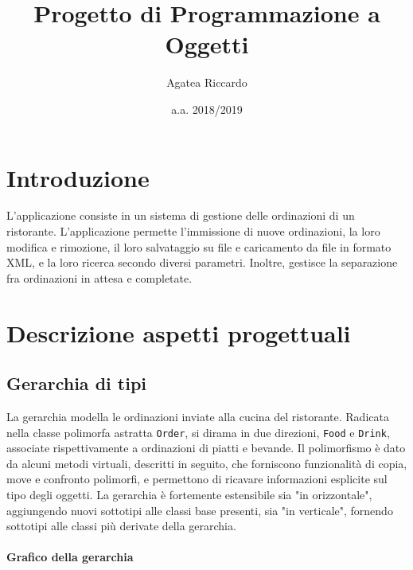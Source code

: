 \documentclass{article}
\title{Progetto di Programmazione a Oggetti}
\author{Agatea Riccardo}
\date{a.a. 2018/2019}
\newcommand{\code}[1]{\texttt{#1}}
\begin{document}
\maketitle
\newpage
{}
\section{Introduzione} %
\label{sec:introduzione}
L'applicazione consiste in un sistema di gestione delle ordinazioni di un ristorante. L'applicazione permette l'immissione di nuove ordinazioni, la loro modifica e rimozione, il loro salvataggio su file e caricamento da file in formato XML, e la loro ricerca secondo diversi parametri. Inoltre, gestisce la separazione fra ordinazioni in attesa e completate.
\section{Descrizione aspetti progettuali} %
\label{sec:descrizione_aspetti_progettuali}
\subsection{Gerarchia di tipi} %
\label{sub:gerarchia_di_tipi}
La gerarchia modella le ordinazioni inviate alla cucina del ristorante. Radicata nella classe polimorfa astratta \code{Order}, si dirama in due direzioni, \code{Food} e \code{Drink}, associate rispettivamente a ordinazioni di piatti e bevande. Il polimorfismo è dato da alcuni metodi virtuali, descritti in seguito, che forniscono funzionalità di copia, move e confronto polimorfi, e permettono di ricavare informazioni esplicite sul tipo degli oggetti. La gerarchia è fortemente estensibile sia "in orizzontale", aggiungendo nuovi sottotipi alle classi base presenti, sia "in verticale", fornendo sottotipi alle classi più derivate della gerarchia.
\paragraph{Grafico della gerarchia} %
\label{par:grafico_della_gerarchia}

\end{document}
